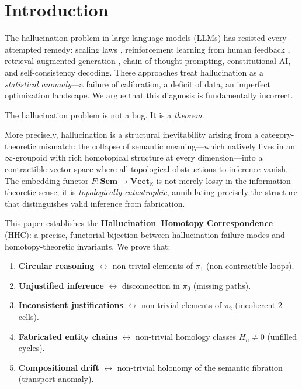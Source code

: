 \documentclass[11pt,a4paper]{article}
\theoremstyle{plain}
\theoremstyle{definition}
\newcommand{\Sem}{\mathbf{Sem}}
\newcommand{\Vect}{\mathbf{Vect}}
\begin{document}
\tableofcontents
\newpage

\section{Introduction}\label{sec:intro}

The hallucination problem in large language models (LLMs) has resisted every attempted remedy: scaling laws \cite{openai2023gpt4}, reinforcement learning from human feedback \cite{ouyang2022training}, retrieval-augmented generation \cite{lewis2020retrieval}, chain-of-thought prompting, constitutional AI, and self-consistency decoding. These approaches treat hallucination as a \emph{statistical anomaly}---a failure of calibration, a deficit of data, an imperfect optimization landscape. We argue that this diagnosis is fundamentally incorrect.

The hallucination problem is not a bug. It is a \emph{theorem}.

More precisely, hallucination is a structural inevitability arising from a category-theoretic mismatch: the collapse of semantic meaning---which natively lives in an $\infty$-groupoid with rich homotopical structure at every dimension---into a contractible vector space where all topological obstructions to inference vanish. The embedding functor $F\colon \Sem \to \Vect_{\mathbb{R}}$ is not merely lossy in the information-theoretic sense; it is \emph{topologically catastrophic}, annihilating precisely the structure that distinguishes valid inference from fabrication.

This paper establishes the \textbf{Hallucination--Homotopy Correspondence} (HHC): a precise, functorial bijection between hallucination failure modes and homotopy-theoretic invariants. We prove that:

\begin{enumerate}[leftmargin=*,nosep]
  \item \textbf{Circular reasoning} $\longleftrightarrow$ non-trivial elements of $\pi_1$ (non-contractible loops).
  \item \textbf{Unjustified inference} $\longleftrightarrow$ disconnection in $\pi_0$ (missing paths).
  \item \textbf{Inconsistent justifications} $\longleftrightarrow$ non-trivial elements of $\pi_2$ (incoherent 2-cells).
  \item \textbf{Fabricated entity chains} $\longleftrightarrow$ non-trivial homology classes $H_n \neq 0$ (unfilled cycles).
  \item \textbf{Compositional drift} $\longleftrightarrow$ non-trivial holonomy of the semantic fibration (transport anomaly).
\end{enumerate}
\end{document}
